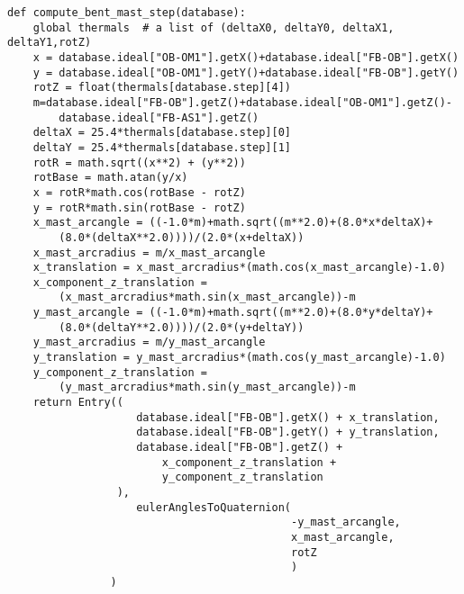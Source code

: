 \begin{verbatim}
def compute_bent_mast_step(database):
    global thermals  # a list of (deltaX0, deltaY0, deltaX1, deltaY1,rotZ) 
    x = database.ideal["OB-OM1"].getX()+database.ideal["FB-OB"].getX()
    y = database.ideal["OB-OM1"].getY()+database.ideal["FB-OB"].getY()
    rotZ = float(thermals[database.step][4])
    m=database.ideal["FB-OB"].getZ()+database.ideal["OB-OM1"].getZ()-
        database.ideal["FB-AS1"].getZ()
    deltaX = 25.4*thermals[database.step][0]
    deltaY = 25.4*thermals[database.step][1]
    rotR = math.sqrt((x**2) + (y**2))
    rotBase = math.atan(y/x)
    x = rotR*math.cos(rotBase - rotZ)
    y = rotR*math.sin(rotBase - rotZ)
    x_mast_arcangle = ((-1.0*m)+math.sqrt((m**2.0)+(8.0*x*deltaX)+
        (8.0*(deltaX**2.0))))/(2.0*(x+deltaX))
    x_mast_arcradius = m/x_mast_arcangle
    x_translation = x_mast_arcradius*(math.cos(x_mast_arcangle)-1.0)
    x_component_z_translation = 
        (x_mast_arcradius*math.sin(x_mast_arcangle))-m
    y_mast_arcangle = ((-1.0*m)+math.sqrt((m**2.0)+(8.0*y*deltaY)+
        (8.0*(deltaY**2.0))))/(2.0*(y+deltaY))
    y_mast_arcradius = m/y_mast_arcangle
    y_translation = y_mast_arcradius*(math.cos(y_mast_arcangle)-1.0)
    y_component_z_translation = 
        (y_mast_arcradius*math.sin(y_mast_arcangle))-m
    return Entry((
                    database.ideal["FB-OB"].getX() + x_translation,
                    database.ideal["FB-OB"].getY() + y_translation,
                    database.ideal["FB-OB"].getZ() + 
                        x_component_z_translation + 
                        y_component_z_translation
                 ),
                    eulerAnglesToQuaternion(
                                            -y_mast_arcangle,
                                            x_mast_arcangle,
                                            rotZ
                                            )
                )
\end{verbatim}




